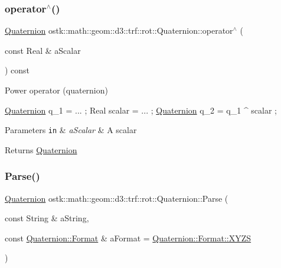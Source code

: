 \subsubsection{\texorpdfstring{operator$^\wedge$()}{operator^()}}
{\footnotesize\ttfamily \hyperlink{classostk_1_1math_1_1geom_1_1d3_1_1trf_1_1rot_1_1_quaternion}{Quaternion} ostk\+::math\+::geom\+::d3\+::trf\+::rot\+::\+Quaternion\+::operator$^\wedge$ (\begin{DoxyParamCaption}\item[{const Real \&}]{a\+Scalar }\end{DoxyParamCaption}) const}



Power operator (quaternion) 


\begin{DoxyCode}
\hyperlink{classostk_1_1math_1_1geom_1_1d3_1_1trf_1_1rot_1_1_quaternion_ad9fd7d8eb5effb4d4e0394bbb5bb86dc}{Quaternion} q\_1 = ... ;
Real scalar = ... ;
\hyperlink{classostk_1_1math_1_1geom_1_1d3_1_1trf_1_1rot_1_1_quaternion_ad9fd7d8eb5effb4d4e0394bbb5bb86dc}{Quaternion} q\_2 = q\_1 ^ scalar ;
\end{DoxyCode}



\begin{DoxyParams}[1]{Parameters}
\mbox{\tt in}  & {\em a\+Scalar} & A scalar \\
\hline
\end{DoxyParams}
\begin{DoxyReturn}{Returns}
\hyperlink{classostk_1_1math_1_1geom_1_1d3_1_1trf_1_1rot_1_1_quaternion}{Quaternion} 
\end{DoxyReturn}
\mbox{\label{classostk_1_1math_1_1geom_1_1d3_1_1trf_1_1rot_1_1_quaternion_a43e3a5770d4543534712cea86fb0202b}} 
\subsubsection{\texorpdfstring{Parse()}{Parse()}}
{\footnotesize\ttfamily \hyperlink{classostk_1_1math_1_1geom_1_1d3_1_1trf_1_1rot_1_1_quaternion}{Quaternion} ostk\+::math\+::geom\+::d3\+::trf\+::rot\+::\+Quaternion\+::\+Parse (\begin{DoxyParamCaption}\item[{const String \&}]{a\+String,  }\item[{const \hyperlink{classostk_1_1math_1_1geom_1_1d3_1_1trf_1_1rot_1_1_quaternion_aa7a75f0dd505a58236ee355959e00bfd}{Quaternion\+::\+Format} \&}]{a\+Format = {\ttfamily \hyperlink{classostk_1_1math_1_1geom_1_1d3_1_1trf_1_1rot_1_1_quaternion_aa7a75f0dd505a58236ee355959e00bfda11c51ecd5dc6f86ba3c1ae79e21482f5}{Quaternion\+::\+Format\+::\+X\+Y\+ZS}} }\end{DoxyParamCaption})\hspace{0.3cm}{\ttfamily [static]}}



